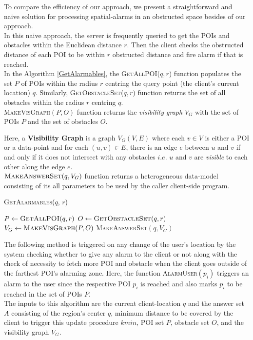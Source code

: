 \documentclass{sig-alternate}
\begin{document}
To compare the efficiency of our approach, we present a straightforward and naive solution for processing spatial-alarms in an obstructed space besides of our approach.\\

In this naive approach, the server is frequently queried to get the POIs and obstacles within the Euclidean distance $r$. Then the client checks the obstructed distance of each POI to be within $r$ obstructed distance and fire alarm if that is reached.\\

In the Algorithm \ref{GetAlarmables}, the \textsc{GetAllPOI}($q, r$) function populates the set $P$ of POIs within the radius $r$ centring the query point (the client's current location) $q$. Similarly, \textsc{GetObstacleSet}($q, r$) function returns the set of all obstacles within the radius $r$ centring $q$.\\

\textsc{MakeVisGraph}$(P,O)$ function returns the \textit{visibility graph} $V_G$ with the set of POIs $P$ and the set of obstacles $O$.

Here, a \textbf{Visibility Graph} is a graph $V_G(V,E)$ where each $v \in V$ is either a POI or a data-point and for each $(u,v) \in E$, there is an edge $e$ between $u$ and $v$ if and only if it does not intersect with any obstacles $i.e.$ $u$ and $v$ are \textit{visible} to each other along the edge $e$.\\

$\textsc{MakeAnswerSet}(q, V_G)$ function returns a heterogeneous data-model consisting of its all parameters to be used by the caller client-side program.

\DontPrintSemicolon
\begin{algorithm}
\caption{\textsc{GetAlarmables}($q$, $r$)}
	
	 $P \gets \textsc{GetAllPOI}(q, r)$ \;
	 $O \gets \textsc{GetObstacleSet}(q, r)$ \;
	 $V_G \gets \textsc{MakeVisGraph}(P, O)$ \;
	\Return \textsc{MakeAnswerSet}$(q, V_G)$ \;
\label{GetAlarmables}
\end{algorithm}

The following method is triggered on any change of the user's location by the system checking whether to give any alarm to the client or not along with the check of necessity to fetch more POI and obstacle when the client goes outside of the farthest POI's alarming zone.
Here, the function \textsc{AlarmUser}$(p_i)$ triggers an alarm to the user since the respective POI $p_i$ is reached and also marks $p_i$ to be reached in the set of POIs $P$. \\
The inputs to this algorithm are the current client-location $q$ and the answer set $A$ consisting of the region's center $q$, minimum distance to be covered by the client to trigger this update procedure $k{min}$, POI set $P$, obstacle set $O$, and the visibility graph $V_G$.
 
\end{document}
